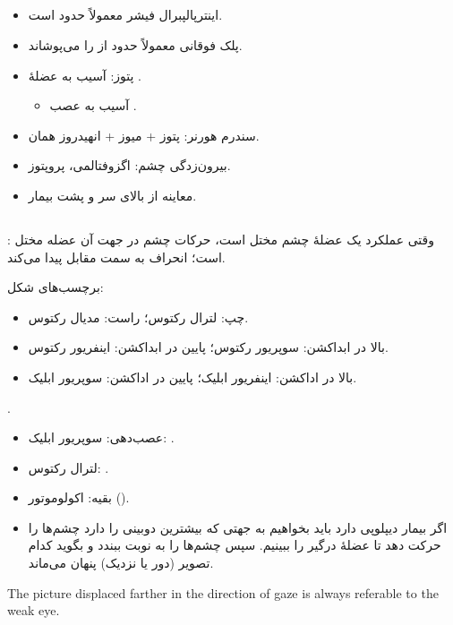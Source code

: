 \documentclass[a4paper,12pt]{extbook}
\begin{document}
\subsection*{}
\begin{itemize}
\item اینترپالپبرال فیشر معمولاً حدود \NEen{10mm} است.
\item پلک فوقانی معمولاً حدود  از  را می‌پوشاند.
\end{itemize}

\begin{itemize}
\item پتوز: آسیب به عضلهٔ .
  \begin{itemize}
  \item آسیب به عصب .
  \end{itemize}
\item سندرم هورنر: پتوز + میوز + انهیدروز همان.
\item بیرون‌زدگی چشم: اگزوفتالمی، پروپتوز.
\item معاینه از بالای سر و پشت بیمار.
\end{itemize}
\subsection*{}
: وقتی عملکرد یک عضلهٔ چشم مختل است، حرکات چشم در جهت آن عضله مختل است؛ انحراف به سمت مقابل پیدا می‌کند.
\begin{center}
\end{center}
برچسب‌های شکل:
\begin{itemize}
\item چپ: لترال رکتوس؛ راست: مدیال رکتوس.
\item بالا در ابداکشن: سوپریور رکتوس؛ پایین در ابداکشن: اینفریور رکتوس.
\item بالا در اداکشن: اینفریور ابلیک؛ پایین در اداکشن: سوپریور ابلیک.
\end{itemize}
.
\begin{itemize}
\item عصب‌دهی: سوپریور ابلیک: .
\item لترال رکتوس: .
\item بقیه: اکولوموتور ().
\item اگر بیمار دیپلوپی دارد باید بخواهیم به جهتی که بیشترین دوبینی را دارد چشم‌ها را حرکت دهد تا عضلهٔ درگیر را ببینیم. سپس چشم‌ها را به نوبت ببندد و بگوید کدام تصویر (دور یا نزدیک) پنهان می‌ماند.
\end{itemize}
\begin{latin}
The picture displaced farther in the direction of gaze is always referable to the weak eye.
\end{latin}
\end{document}
